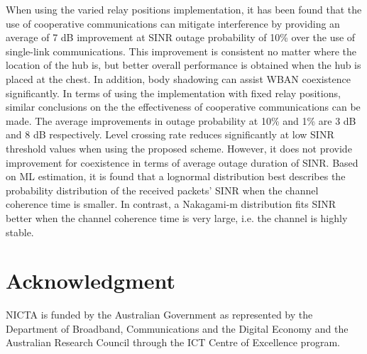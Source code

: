 \documentclass[12pt,draftcls,a4paper,onecolumn,journal]{IEEEtran}
\begin{document}
When using the varied relay positions implementation, it has been found that the use of cooperative communications can mitigate interference by providing an average of 7 dB improvement at SINR outage probability of 10\% over the use of single-link communications. This improvement is consistent no matter where the location of the hub is, but better overall performance is obtained when the hub is placed at the chest. In addition, body shadowing can assist WBAN coexistence significantly. In terms of using the implementation with fixed relay positions, similar conclusions on the the effectiveness of cooperative communications can be made. The average improvements in outage probability at 10\% and 1\% are 3 dB and 8 dB respectively. Level crossing rate reduces significantly at low SINR threshold values when using the proposed scheme. However, it does not provide improvement for coexistence in terms of average outage duration of SINR. Based on ML estimation, it is found that a lognormal distribution best describes the probability distribution of the received packets' SINR when the channel coherence time is smaller. In contrast, a Nakagami-m distribution fits SINR better when the channel coherence time is very large, i.e. the channel is highly stable.




\section*{Acknowledgment}

NICTA is funded
by the Australian Government as represented by the Department of
Broadband, Communications and the Digital Economy and the Australian
Research Council through the ICT Centre of Excellence program.


\ifCLASSOPTIONcaptionsoff
  \newpage
\fi
\end{document}
